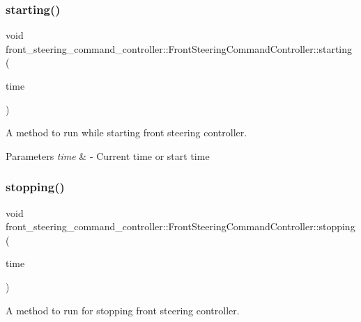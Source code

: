 \subsubsection{\texorpdfstring{starting()}{starting()}}
{\footnotesize\ttfamily void front\+\_\+steering\+\_\+command\+\_\+controller\+::\+Front\+Steering\+Command\+Controller\+::starting (\begin{DoxyParamCaption}\item[{const ros\+::\+Time \&}]{time }\end{DoxyParamCaption})\hspace{0.3cm}{\ttfamily [inline]}}



A method to run while starting front steering controller. 


\begin{DoxyParams}{Parameters}
{\em time} & -\/ Current time or start time \\
\hline
\end{DoxyParams}
\mbox{\label{classfront__steering__command__controller_1_1FrontSteeringCommandController_a442344a75d48347c41ab7457397e06cc}} 
\subsubsection{\texorpdfstring{stopping()}{stopping()}}
{\footnotesize\ttfamily void front\+\_\+steering\+\_\+command\+\_\+controller\+::\+Front\+Steering\+Command\+Controller\+::stopping (\begin{DoxyParamCaption}\item[{const ros\+::\+Time \&}]{time }\end{DoxyParamCaption})\hspace{0.3cm}{\ttfamily [inline]}}



A method to run for stopping front steering controller. 


